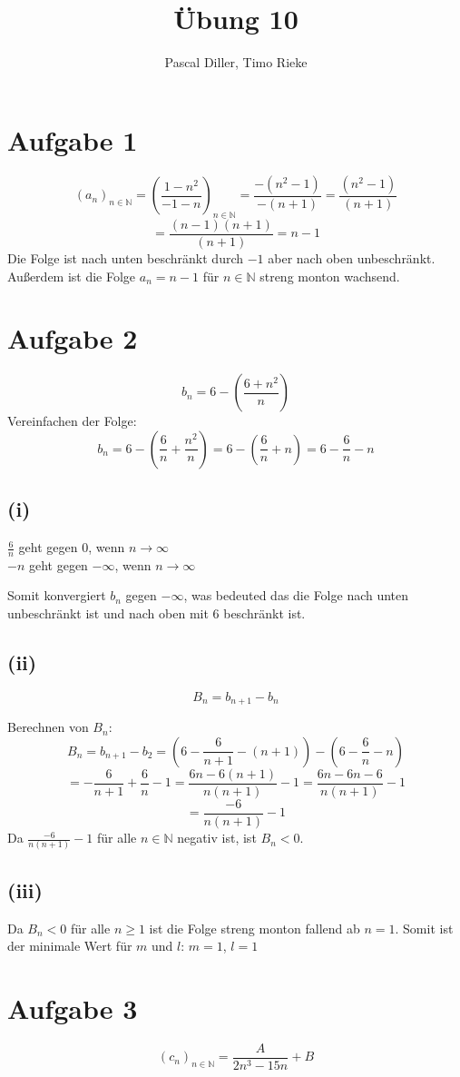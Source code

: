 \documentclass{article}
\title{Übung 10}
\author{Pascal Diller, Timo Rieke}
\begin{document}
\maketitle

\section{Aufgabe 1}
\[(a_n)_{n\in \mathbb{N}}=(\frac{1-n^2}{-1-n})_{n \in \mathbb{N}} = \frac{-(n^2-1)}{-(n+1)}= \frac{(n^2-1)}{(n+1)}\]
\[= \frac{(n-1)(n+1)}{(n+1)} = n-1\]
Die Folge ist nach unten beschränkt durch $-1$ aber nach oben unbeschränkt.
Außerdem ist die Folge $a_n = n-1$ für $n \in \mathbb{N}$ streng monton wachsend.

\section{Aufgabe 2}
\[b_n = 6-(\frac{6+n^2}{n})\]
Vereinfachen der Folge:
\[b_n = 6-(\frac{6}{n}+\frac{n^2}{n}) = 6- (\frac{6}{n}+n) = 6-\frac{6}{n}-n\]

\subsection{(i)}
\begin{center}
    $\frac{6}{n}$ geht gegen 0, wenn $n \xrightarrow{} \infty$ \\
    $-n$ geht gegen $-\infty$, wenn $n \xrightarrow{} \infty$ 
\end{center}
Somit konvergiert $b_n$ gegen $-\infty$, was bedeuted das die Folge nach unten unbeschränkt ist und nach oben mit 6 beschränkt ist.

\subsection{(ii)}
\[B_n= b_{n+1}-b_n\]

Berechnen von $B_n$:
\[B_n = b_{n+1}-b_2 = (6-\frac{6}{n+1}-(n+1))-(6-\frac{6}{n}-n)\]
\[= -\frac{6}{n+1}+\frac{6}{n}-1 = \frac{6n-6(n+1)}{n(n+1)}-1= \frac{6n-6n-6}{n(n+1)}-1\]
\[=\frac{-6}{n(n+1)}-1\]
Da $\frac{-6}{n(n+1)}-1$ für alle $n \in \mathbb{N}$ negativ ist, ist $B_n<0$.

\subsection{(iii)}
Da $B_n <0$ für alle $n \geq 1$ ist die Folge streng monton fallend ab $n=1$.
Somit ist der minimale Wert für $m$ und $l$: $m=1$, $l=1$

\section{Aufgabe 3}
\[(c_n)_{n \in \mathbb{N}}=\frac{A}{2n^3-15n}+B\]
\end{document}
